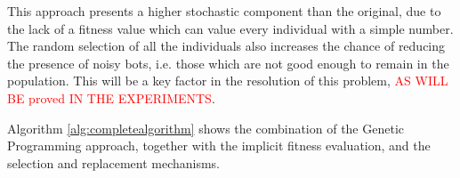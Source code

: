 \documentclass[conference]{IEEEtran}
\begin{document}
This approach presents a higher stochastic component than the
original, %
due to the lack of a fitness value which can value every individual with a simple number. The random selection of all the individuals also increases the chance of reducing the presence of noisy bots, i.e. those which are not good enough to remain in the population.
This will be a key factor in the resolution of this problem,
\textcolor{red}{AS WILL BE proved IN THE EXPERIMENTS}.



Algorithm \ref{alg:completealgorithm} shows the combination of the Genetic Programming approach, together with the implicit fitness evaluation, and the selection and replacement mechanisms.
\end{document}
